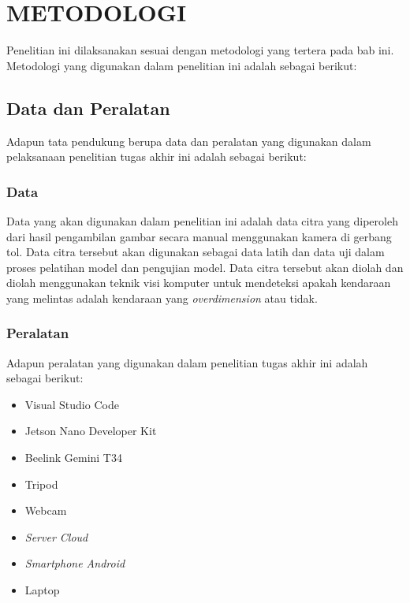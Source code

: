\chapter{METODOLOGI}
\label{chap:metodologi}


Penelitian ini dilaksanakan sesuai dengan metodologi yang tertera pada bab ini. Metodologi yang digunakan dalam penelitian ini adalah sebagai berikut:

\section{Data dan Peralatan}
Adapun tata pendukung berupa data dan peralatan yang digunakan dalam pelaksanaan penelitian tugas akhir ini adalah sebagai berikut:

\subsection{Data}

Data yang akan digunakan dalam penelitian ini adalah data citra yang diperoleh dari hasil pengambilan gambar secara manual menggunakan kamera di gerbang tol. Data citra tersebut akan digunakan sebagai data latih dan data uji dalam proses pelatihan model dan pengujian model. Data citra tersebut akan diolah dan diolah menggunakan teknik visi komputer untuk mendeteksi apakah kendaraan yang melintas adalah kendaraan yang \emph{overdimension} atau tidak.

\subsection{Peralatan}

Adapun peralatan yang digunakan dalam penelitian tugas akhir ini adalah sebagai berikut:

\begin{itemize}[noitemsep,nolistsep]
  \setlength{\itemsep}{7pt}
  \setlength{\parskip}{0pt}
  \setlength{\parsep}{0pt}
  \item Visual Studio Code
  \item Jetson Nano Developer Kit
  \item Beelink Gemini T34
  \item Tripod
  \item Webcam
  \item \emph{Server Cloud}
  \item \emph{Smartphone Android}
  \item Laptop
\end{itemize}

